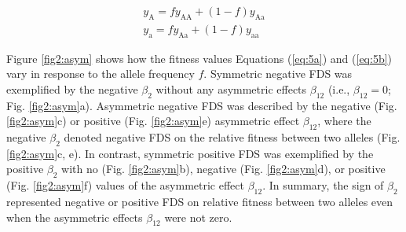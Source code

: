 \documentclass[12pt,]{article}
\begin{document}
\begin{subequations}
\begin{align}
y_\mathrm{A} = f y_\mathrm{AA} + (1 - f) y_\mathrm{Aa} \label{eq:5a} \\
y_\mathrm{a} = f y_\mathrm{Aa} + (1 - f) y_\mathrm{aa} \label{eq:5b}
\end{align}
\end{subequations}

Figure \ref{fig2:asym} shows how the fitness values Equations (\ref{eq:5a}) and (\ref{eq:5b}) vary in response to the allele frequency $f$. Symmetric negative FDS was exemplified by the negative $\beta_2$ without any asymmetric effects $\beta_{12}$ (i.e., $\beta_{12}=0$; Fig. \ref{fig2:asym}a). Asymmetric negative FDS was described by the negative (Fig. \ref{fig2:asym}c) or positive (Fig. \ref{fig2:asym}e) asymmetric effect $\beta_{12}$, where the negative $\beta_2$ denoted negative FDS on the relative fitness between two alleles (Fig. \ref{fig2:asym}c, e). In contrast, symmetric positive FDS was exemplified by the positive $\beta_2$ with no (Fig. \ref{fig2:asym}b), negative (Fig. \ref{fig2:asym}d), or positive (Fig. \ref{fig2:asym}f) values of the asymmetric effect $\beta_{12}$. In summary, the sign of $\beta_2$ represented negative or positive FDS on relative fitness between two alleles even when the asymmetric effects $\beta_{12}$ were not zero.
\end{document}
